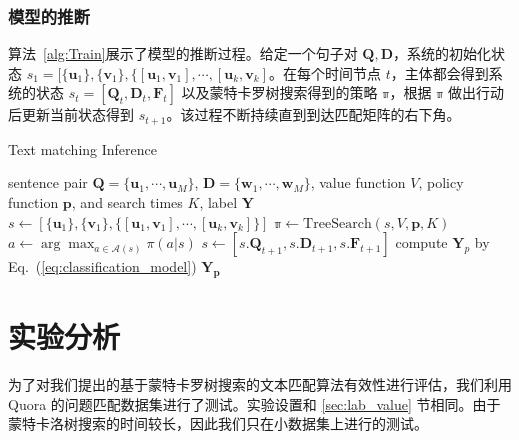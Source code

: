 \subsubsection{模型的推断}
算法~\ref{alg:Train}展示了模型的推断过程。给定一个句子对 $\mathbf{Q}, \mathbf{D}$，系统的初始化状态 $s_1=[\{\mathbf{u}_1\}, \{\mathbf{v}_1\}, \{[\mathbf{u}_1,\mathbf{v}_1], \cdots, [\mathbf{u}_k, \mathbf{v}_k]$。在每个时间节点 $t$，主体都会得到系统的状态 $s_t=[\mathbf{Q}_t, \mathbf{D}_t, \mathbf{F}_t]$ 以及蒙特卡罗树搜索得到的策略 $\mathbb{\pi}$，根据 $\mathbb{\pi}$ 做出行动后更新当前状态得到 $s_{t+1}$。该过程不断持续直到到达匹配矩阵的右下角。

\begin{algorithm}[!htbp]
\caption{Text matching Inference}\label{alg:RLRank_MCTS}
\renewcommand{\algorithmicrequire}{\textbf{Input:}}
\renewcommand{\algorithmicensure}{\textbf{Output:}}
\begin{algorithmic}[1]
\Require sentence pair $\mathbf{Q}=\{\mathbf{u}_1, \cdots, \mathbf{u}_M\}$, $\mathbf{D}=\{\mathbf{w}_1, \cdots, \mathbf{w}_M\}$, value function $V$, policy function $\mathbf{p}$, and search times $K$,
\Ensure label $\mathbf{Y}$
\State $s \leftarrow [\{\mathbf{u}_1\}, \{\mathbf{v}_1\}, \{[\mathbf{u}_1,\mathbf{v}_1], \cdots, [\mathbf{u}_k, \mathbf{v}_k]\}]$
  \State $\mathbb{\pi} \leftarrow \mathrm{TreeSearch}(s, V, \mathbf{p}, K)$
  \State $a \leftarrow \arg\max_{a\in\mathcal{A}(s)} \pi(a|s)$
  \State $s \leftarrow [s.\mathbf{Q}_{t+1}, s.\mathbf{D}_{t+1}, s.\mathbf{F}_{t+1}]$
\EndWhile
\State compute $\mathbf{Y}_p$ by Eq.~(\ref{eq:classification_model})
\State \Return $\mathbf{Y_p}$
\end{algorithmic}
\end{algorithm}


\section{实验分析}
为了对我们提出的基于蒙特卡罗树搜索的文本匹配算法有效性进行评估，我们利用 Quora 的问题匹配数据集进行了测试。实验设置和 \ref{sec:lab_value} 节相同。由于蒙特卡洛树搜索的时间较长，因此我们只在小数据集上进行的测试。


